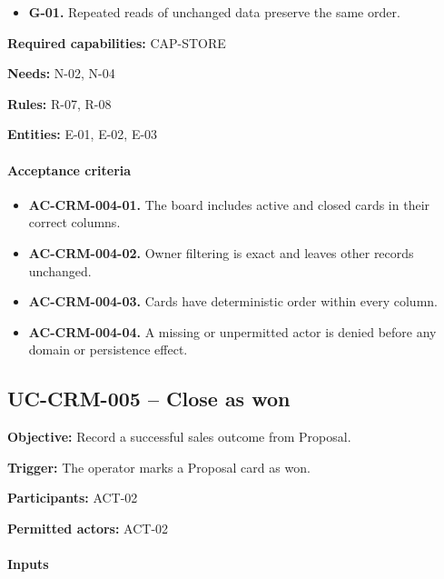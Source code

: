 \documentclass[10pt,a4paper]{article}
\begin{document}
\begin{itemize}

\item \textbf{G-01.} Repeated reads of unchanged data preserve the same order.

\end{itemize}

\textbf{Required capabilities:} CAP-STORE

\textbf{Needs:} N-02, N-04

\textbf{Rules:} R-07, R-08

\textbf{Entities:} E-01, E-02, E-03

\paragraph{Acceptance criteria}

\begin{itemize}

\item \textbf{AC-CRM-004-01.} The board includes active and closed cards in their correct columns.

\item \textbf{AC-CRM-004-02.} Owner filtering is exact and leaves other records unchanged.

\item \textbf{AC-CRM-004-03.} Cards have deterministic order within every column.

\item \textbf{AC-CRM-004-04.} A missing or unpermitted actor is denied before any domain or persistence effect.

\end{itemize}

\subsection{UC-CRM-005 -- Close as won}

\textbf{Objective:} Record a successful sales outcome from Proposal.

\textbf{Trigger:} The operator marks a Proposal card as won.

\textbf{Participants:} ACT-02

\textbf{Permitted actors:} ACT-02

\paragraph{Inputs}
\end{document}
